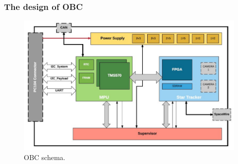 \documentclass[12pt,a4paper,oneside]{article}
\begin{document}
\subsubsection{The design of OBC}

\begin{figure}[!htbp]
\includegraphics[scale=0.41]{obc_all.png}
\centering
\caption{OBC schema\cite{gaska2016obc}.}
\label{fig:obc-all}
\end{figure}
\end{document}
